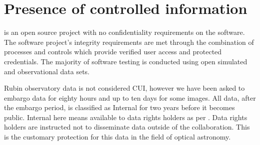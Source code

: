 \section{Presence of controlled information}\label{sec:cui}
\VRO is an open source project with no confidentiality requirements on the software.
The software project’s integrity requirements are met through the combination of
processes and controls which provide verified user access and protected credentials.
The majority of software testing is conducted using open simulated and observational data sets.

Rubin observatory data is not considered \gls{CUI}, however we have been asked to embargo data for eighty hours and up to ten days for some images.
All data, after the embargo period,  is classified as Internal for two years before it becomes public.
Internal here means available to data rights holders as per .
Data rights holders are instructed not to disseminate data outside of the collaboration.
This is the customary protection for this data in the field of optical astronomy.





